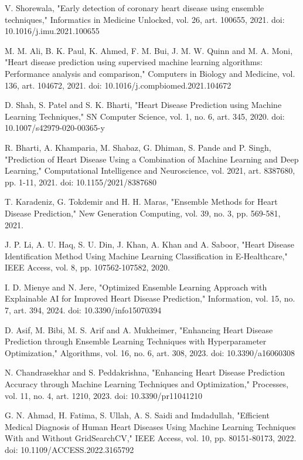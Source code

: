 \documentclass[12pt,a4paper,oneside]{report}
\begin{document}
\begin{enumerate}[label={[\arabic*]},leftmargin=2.2em]
  \item V. Shorewala, "Early detection of coronary heart disease using ensemble techniques," Informatics in Medicine Unlocked, vol. 26, art. 100655, 2021. doi: 10.1016/j.imu.2021.100655
  \item M. M. Ali, B. K. Paul, K. Ahmed, F. M. Bui, J. M. W. Quinn and M. A. Moni, "Heart disease prediction using supervised machine learning algorithms: Performance analysis and comparison," Computers in Biology and Medicine, vol. 136, art. 104672, 2021. doi: 10.1016/j.compbiomed.2021.104672
  \item D. Shah, S. Patel and S. K. Bharti, "Heart Disease Prediction using Machine Learning Techniques," SN Computer Science, vol. 1, no. 6, art. 345, 2020. doi: 10.1007/s42979-020-00365-y
  \item R. Bharti, A. Khamparia, M. Shabaz, G. Dhiman, S. Pande and P. Singh, "Prediction of Heart Disease Using a Combination of Machine Learning and Deep Learning," Computational Intelligence and Neuroscience, vol. 2021, art. 8387680, pp. 1-11, 2021. doi: 10.1155/2021/8387680
  \item T. Karadeniz, G. Tokdemir and H. H. Maras, "Ensemble Methods for Heart Disease Prediction," New Generation Computing, vol. 39, no. 3, pp. 569-581, 2021.
  \item J. P. Li, A. U. Haq, S. U. Din, J. Khan, A. Khan and A. Saboor, "Heart Disease Identification Method Using Machine Learning Classification in E-Healthcare," IEEE Access, vol. 8, pp. 107562-107582, 2020.
  \item I. D. Mienye and N. Jere, "Optimized Ensemble Learning Approach with Explainable AI for Improved Heart Disease Prediction," Information, vol. 15, no. 7, art. 394, 2024. doi: 10.3390/info15070394
  \item D. Asif, M. Bibi, M. S. Arif and A. Mukheimer, "Enhancing Heart Disease Prediction through Ensemble Learning Techniques with Hyperparameter Optimization," Algorithms, vol. 16, no. 6, art. 308, 2023. doi: 10.3390/a16060308
  \item N. Chandrasekhar and S. Peddakrishna, "Enhancing Heart Disease Prediction Accuracy through Machine Learning Techniques and Optimization," Processes, vol. 11, no. 4, art. 1210, 2023. doi: 10.3390/pr11041210
  \item G. N. Ahmad, H. Fatima, S. Ullah, A. S. Saidi and Imdadullah, "Efficient Medical Diagnosis of Human Heart Diseases Using Machine Learning Techniques With and Without GridSearchCV," IEEE Access, vol. 10, pp. 80151-80173, 2022. doi: 10.1109/ACCESS.2022.3165792

\end{enumerate}
\end{document}
